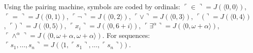 Using the pairing machine, symbols are coded by ordinals: $\ulcorner \in \urcorner = J(\langle 0, 0 \rangle)$, $\ulcorner = \urcorner = J(\langle 0, 1 \rangle)$, $\ulcorner \neg \urcorner = J(\langle 0, 2 \rangle)$, $\ulcorner \lor \urcorner = J(\langle 0, 3 \rangle)$, $\ulcorner ( \urcorner = J(\langle 0, 4 \rangle)$, $\ulcorner ) \urcorner = J(\langle 0, 5 \rangle)$, $\ulcorner x_i \urcorner = J(\langle 0, 6 + i \rangle)$, $\ulcorner \exists^\alpha \urcorner = J(\langle 0, \omega + \alpha \rangle)$, $\ulcorner \wedge^\alpha \urcorner = J(\langle 0, \omega + \alpha, \omega + \alpha \rangle)$. For sequences: $\ulcorner s_1, \ldots, s_n \urcorner = J(\langle 1, \ulcorner s_1 \urcorner, \ldots, \ulcorner s_n \urcorner \rangle)$.
